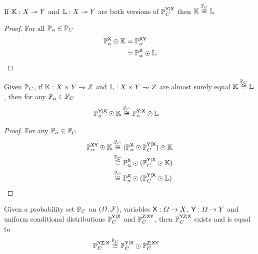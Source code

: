 \begin{lemma}
If $\mathbb{K}:X\rightarrowtriangle Y$ and $\mathbb{L}:X\rightarrowtriangle Y$ are both versions of $\mathbb{P}_C^{\mathsf{Y}|\mathsf{X}}$ then $\mathbb{K}\overset{\mathbb{P}_C}{\cong}\mathbb{L}$
\end{lemma}

\begin{proof}
For all $\mathbb{P}_\alpha \in \mathbb{P}_C$
\begin{align}
    \mathbb{P}^{\mathsf{X}}_\alpha\odot \mathbb{K} &= \mathbb{P}^{\mathsf{XY}}_\alpha\\
    &= \mathbb{P}^{\mathsf{X}}_\alpha\odot \mathbb{L}
\end{align}
\end{proof}

\begin{lemma}\label{lem:sub_asequal}
Given $\mathbb{P}_C$, if $\mathbb{K}:X\times Y \rightarrowtriangle Z$ and $\mathbb{L}:X\times Y \rightarrowtriangle Z$ are almost surely equal $\mathbb{K}\overset{\mathbb{P}_C}{\cong}\mathbb{L}$, then for any $\mathbb{P}_\alpha\in \mathbb{P}_C$
\begin{align}
    \mathbb{P}_\alpha^{\mathsf{Y}|\mathsf{X}}\odot \mathbb{K} &\overset{\mathbb{P}_C}{\cong} \mathbb{P}_\alpha^{\mathsf{Y}|\mathsf{X}}\odot \mathbb{L}
\end{align}
\end{lemma}

\begin{proof}
For any $\mathbb{P}_\alpha\in\mathbb{P}_C$
\begin{align}
    \mathbb{P}_\alpha^{\mathsf{XY}}\odot \mathbb{K} &\overset{\mathbb{P}_C}{\cong} (\mathbb{P}_\alpha^{\mathsf{X}}\odot \mathbb{P}_C^{\mathsf{Y}|\mathsf{X}})\odot \mathbb{K}\\
                                              &\overset{\mathbb{P}_C}{\cong} \mathbb{P}_\alpha^{\mathsf{X}}\odot (\mathbb{P}_C^{\mathsf{Y}|\mathsf{X}}\odot \mathbb{K})\\
                                              &\overset{\mathbb{P}_C}{\cong} \mathbb{P}_\alpha^{\mathsf{X}}\odot (\mathbb{P}_C^{\mathsf{Y}|\mathsf{X}}\odot \mathbb{L})
\end{align}
\end{proof}

\begin{theorem}\label{lem:joint_conditional}
Given a probability set $\mathbb{P}_C$ on $(\Omega,\mathcal{F})$, variables $\mathsf{X}:\Omega\to X$, $\mathsf{Y}:\Omega\to Y$ and uniform conditional distributions $\mathbb{P}_C^{\mathsf{Y}|\mathsf{X}}$ and $\mathbb{P}_C^{\mathsf{Z}|\mathsf{XY}}$, then $\mathbb{P}_C^{\mathsf{YZ}|\mathsf{X}}$ exists and is equal to
\begin{align}
    \mathbb{P}_C^{\mathsf{YZ}|\mathsf{X}} &\overset{\mathbb{P}_C}{\cong} \mathbb{P}_C^{\mathsf{Y}|\mathsf{X}}\odot \mathbb{P}_C^{\mathsf{Z}|\mathsf{XY}}
\end{align}
\end{theorem}

